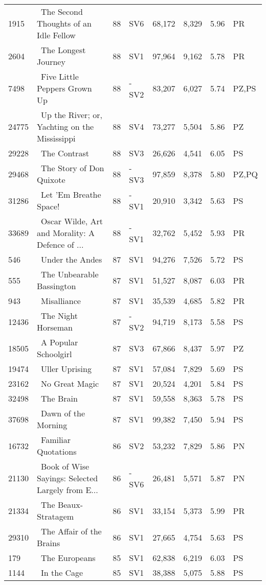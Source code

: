 \begin{longtable}{l | l | l | l | l | l | l | l}
1915 & ~The Second Thoughts of an Idle Fellow & 88 & SV6 & 68,172 & 8,329 & 5.96 & PR\\
2604 & ~The Longest Journey & 88 & SV1 & 97,964 & 9,162 & 5.78 & PR\\
7498 & ~Five Little Peppers Grown Up & 88 & -SV2 & 83,207 & 6,027 & 5.74 & PZ,PS\\
24775 & ~Up the River; or, Yachting on the Mississippi & 88 & SV4 & 73,277 & 5,504 & 5.86 & PZ\\
29228 & ~The Contrast & 88 & SV3 & 26,626 & 4,541 & 6.05 & PS\\
29468 & ~The Story of Don Quixote & 88 & -SV3 & 97,859 & 8,378 & 5.80 & PZ,PQ\\
31286 & ~Let 'Em Breathe Space! & 88 & -SV1 & 20,910 & 3,342 & 5.63 & PS\\
33689 & ~Oscar Wilde, Art and Morality: A Defence of ... & 88 & -SV1 & 32,762 & 5,452 & 5.93 & PR\\
546 & ~Under the Andes & 87 & SV1 & 94,276 & 7,526 & 5.72 & PS\\
555 & ~The Unbearable Bassington & 87 & SV1 & 51,527 & 8,087 & 6.03 & PR\\
943 & ~Misalliance & 87 & SV1 & 35,539 & 4,685 & 5.82 & PR\\
12436 & ~The Night Horseman & 87 & -SV2 & 94,719 & 8,173 & 5.58 & PS\\
18505 & ~A Popular Schoolgirl & 87 & SV3 & 67,866 & 8,437 & 5.97 & PZ\\
19474 & ~Uller Uprising & 87 & SV1 & 57,084 & 7,829 & 5.69 & PS\\
23162 & ~No Great Magic & 87 & SV1 & 20,524 & 4,201 & 5.84 & PS\\
32498 & ~The Brain & 87 & SV1 & 59,558 & 8,363 & 5.78 & PS\\
37698 & ~Dawn of the Morning & 87 & SV1 & 99,382 & 7,450 & 5.94 & PS\\
16732 & ~Familiar Quotations & 86 & SV2 & 53,232 & 7,829 & 5.86 & PN\\
21130 & ~Book of Wise Sayings: Selected Largely from E... & 86 & -SV6 & 26,481 & 5,571 & 5.87 & PN\\
21334 & ~The Beaux-Stratagem & 86 & SV1 & 33,154 & 5,373 & 5.99 & PR\\
29310 & ~The Affair of the Brains & 86 & SV1 & 27,665 & 4,754 & 5.63 & PS\\
179 & ~The Europeans & 85 & SV1 & 62,838 & 6,219 & 6.03 & PS\\
1144 & ~In the Cage & 85 & SV1 & 38,388 & 5,075 & 5.88 & PS\\

\end{longtable}
